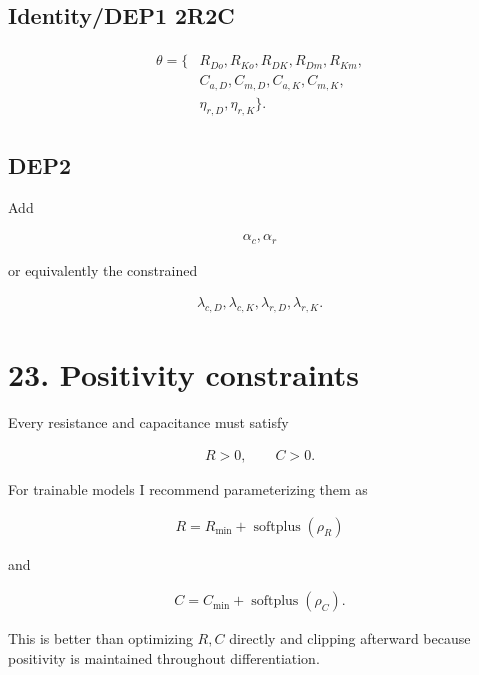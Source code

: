 \documentclass[11pt]{article}
\begin{document}
\subsection*{Identity/DEP1 2R2C}

\begin{align}
\boxed{
\begin{aligned}
\theta=\{&
R_{Do},R_{Ko},R_{DK},
R_{Dm},R_{Km},\\
&
C_{a,D},C_{m,D},
C_{a,K},C_{m,K},\\
&
\eta_{r,D},\eta_{r,K}
\}.
\end{aligned}
}
\end{align}

\subsection*{DEP2}

Add

\begin{align}
\boxed{\alpha_c,\alpha_r}
\end{align}

or equivalently the constrained

\begin{align}
\lambda_{c,D},\lambda_{c,K},
\lambda_{r,D},\lambda_{r,K}.
\end{align}

\section*{23. Positivity constraints}

Every resistance and capacitance must satisfy

\begin{align}
R>0,\qquad C>0.
\end{align}

For trainable models I recommend parameterizing them as

\begin{align}
\boxed{
R=R_{\min}+\operatorname{softplus}(\rho_R)
}
\tag{66}
\end{align}

and

\begin{align}
\boxed{
C=C_{\min}+\operatorname{softplus}(\rho_C).
}
\tag{67}
\end{align}

This is better than optimizing \(R,C\) directly and clipping afterward because positivity is maintained throughout differentiation.
\end{document}
